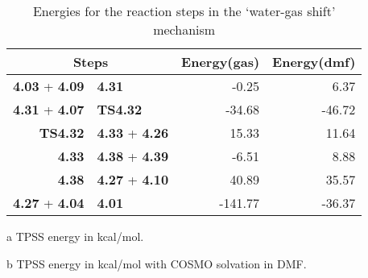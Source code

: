 \begin{table}[!htb]
\centering
 \begin{threeparttable}
  \caption{Energies for the reaction steps in the `water-gas shift' mechanism}
    \begin{tabular}{r@{ $\rightarrow$ }lrr}
    \toprule
    \multicolumn{2}{c}{Steps} & Energy(gas)\tnote{a} & Energy(dmf)\tnote{b} \\
    \midrule
    \textbf{4.03} + \textbf{4.09} & \textbf{4.31} & -0.25 & 6.37 \\
    \textbf{4.31} + \textbf{4.07} & \textbf{TS4.32} & -34.68 & -46.72 \\
    \textbf{TS4.32} & \textbf{4.33} + \textbf{4.26} & 15.33 & 11.64 \\
    \textbf{4.33} & \textbf{4.38} + \textbf{4.39} & -6.51 & 8.88 \\
    \textbf{4.38} & \textbf{4.27} + \textbf{4.10} & 40.89 & 35.57 \\
    \textbf{4.27} + \textbf{4.04} & \textbf{4.01} & -141.77 & -36.37 \\
    \bottomrule
    \end{tabular}%
    \begin{tablenotes}
    \item [a] TPSS energy in kcal/mol.
    \item [b] TPSS energy in kcal/mol with COSMO solvation in DMF.
    \end{tablenotes}
  \label{tab.wgsrxn}%
 \end{threeparttable}
\end{table}%


